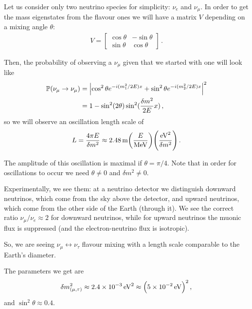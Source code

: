 \documentclass[main.tex]{subfiles}
\begin{document}
Let us consider only two neutrino species for simplicity: \(\nu_{e}\) and \(\nu_{\mu }\). In order to get the mass eigenstates from the flavour ones we will have a matrix \(V\) depending on a mixing angle \(\theta \): 
%
\begin{align}
V = \left[\begin{array}{cc}
\cos \theta  & -\sin \theta  \\ 
\sin \theta  & \cos \theta 
\end{array}\right]
\,.
\end{align}

Then, the probability of observing a \(\nu_{\mu }\) given that we started with one will look like 
%
\begin{align}
\mathbb{P} (\nu_{\mu } \to \nu_{\mu })
&= \abs{
    \cos^2\theta e^{-i (m_1^2 / 2E )x}+
    \sin^2\theta e^{-i (m_2^2 / 2E )x}
}^2  \\
&= 1 - \sin^2 (2 \theta ) \sin^2(\frac{ \delta m^2}{2E} x)
\,,
\end{align}
%
so we will observe an oscillation length scale of 
%
\begin{align}
L = \frac{4 \pi E}{ \delta m^2} \approx \SI{2.48}{m} \qty( \frac{E}{\SI{}{MeV}}) \qty( \frac{ \SI{}{eV^2}}{ \delta m^2})
\,.
\end{align}

The amplitude of this oscillation is maximal if \(\theta= \pi /4\). 
Note that in order for oscillations to occur we need \(\theta \neq 0\) and \(\delta m^2 \neq 0\). 

Experimentally, we see them: at a neutrino detector we distinguish downward neutrinos, which come from the sky above the detector, and upward neutrinos, which come from the other side of the Earth (through it). 
We see the correct ratio \(\nu_{\mu } / \nu_{e} \approx 2\) for downward neutrinos, while for upward neutrinos the muonic flux is suppressed (and the electron-neutrino flux is isotropic).

So, we are seeing \(\nu_{\mu } \leftrightarrow \nu_{\tau }\) flavour mixing with a length scale comparable to the Earth's diameter. 


The parameters we get are 
%
\begin{align}
\delta m^2_{(\mu, \tau )} \approx \SI{2.4e-3}{eV^2} \approx \qty(\SI{5e-2}{eV})^2
\,,
\end{align}
%
and \(\sin^2\theta \approx 0.4\).
\end{document}
